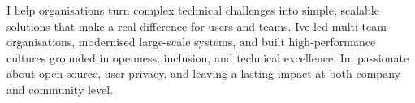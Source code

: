 \documentclass[]{resume-format}
\begin{document}
%


\setlength\fboxsep{10pt}%

\begingroup

\noindent
{}
\endgroup
\vspace{0mm} %



\begin{cvpersonalstatement}
  \item { I help organisations turn complex technical challenges into simple,
scalable solutions that make a real difference for users and teams.
I\textquotesingle{}ve led multi-team organisations, modernised large-scale systems,
and built high-performance cultures grounded in openness, inclusion,
and technical excellence.
I\textquotesingle{}m passionate about open source, user privacy, and leaving a lasting
impact at both company and community level.
 }
\end{cvpersonalstatement}


\end{document}
